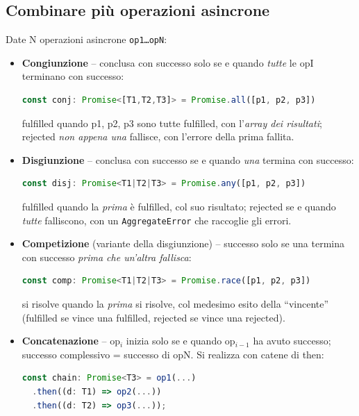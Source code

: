 \subsection{Combinare pi\`u operazioni asincrone}
Date N operazioni asincrone \texttt{op1\dots opN}:
\begin{itemize}
  \item \textbf{Congiunzione} -- conclusa con successo solo se e quando \emph{tutte} le opI
        terminano con successo:
\begin{lstlisting}[language=JavaScript]
const conj: Promise<[T1,T2,T3]> = Promise.all([p1, p2, p3])
\end{lstlisting}
        fulfilled quando p1, p2, p3 sono tutte fulfilled, con l'\emph{array dei risultati};
        rejected \emph{non appena una} fallisce, con l'errore della prima fallita.
  \item \textbf{Disgiunzione} -- conclusa con successo se e quando \emph{una} termina con
        successo:
\begin{lstlisting}[language=JavaScript]
const disj: Promise<T1|T2|T3> = Promise.any([p1, p2, p3])
\end{lstlisting}
        fulfilled quando la \emph{prima} \`e fulfilled, col suo risultato; rejected se e
        quando \emph{tutte} falliscono, con un \texttt{AggregateError} che raccoglie gli
        errori.
  \item \textbf{Competizione} (variante della disgiunzione) -- successo solo se una termina
        con successo \emph{prima che un'altra fallisca}:
\begin{lstlisting}[language=JavaScript]
const comp: Promise<T1|T2|T3> = Promise.race([p1, p2, p3])
\end{lstlisting}
        si risolve quando la \emph{prima} si risolve, col medesimo esito della ``vincente''
        (fulfilled se vince una fulfilled, rejected se vince una rejected).
  \item \textbf{Concatenazione} -- op$_i$ inizia solo se e quando op$_{i-1}$ ha avuto
        successo; successo complessivo = successo di opN. Si realizza con catene di then:
\begin{lstlisting}[language=JavaScript]
const chain: Promise<T3> = op1(...)
  .then((d: T1) => op2(...))
  .then((d: T2) => op3(...));
\end{lstlisting}
\end{itemize}

